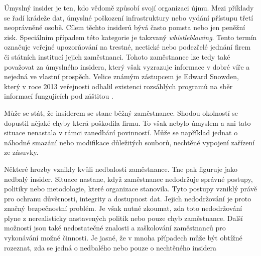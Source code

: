 Úmyslný insider je ten, kdo vědomě způsobí svojí organizaci újmu.
Mezi příklady se řadí krádeže dat, úmyslné poškození infrastruktury nebo vydání přístupu třetí neoprávněné osobě.
Cílem těchto insiderů bývá často pomsta nebo jen peněžní zisk.
Speciálním případem této kategorie je takzvaný \textit{whistleblowing}.
Tento termín označuje veřejné upozorňování na trestné, neetické nebo podezřelé jednání firem či státních institucí jejich zaměstnanci.
Tohoto zaměstnance lze tedy také považovat za úmyslného insidera, který však vyzrazuje informace v dobré víře a nejedná ve vlastní prospěch.
Velice známým zástupcem je Edward Snowden, který v roce 2013 veřejnosti odhalil existenci rozsáhlých programů na sběr informací fungujících pod záštitou \cite{Edward_Snowden}.

Může se stát, že insiderem se stane běžný zaměstnanec.
Shodou okolností se dopustil nějaké chyby která poškodila firmu.
To však nebylo úmyslem a ani tato situace nenastala v rámci zanedbání povinností.
Může se například jednat o náhodné smazání nebo modifikace důležitých souborů, nechtěné vypojení zařízení ze zásuvky.

Některé hrozby vznikly kvůli nedbalosti zaměstnance.
Tne pak figuruje jako nedbalý insider.
Situace nastane, když zaměstnanec nedodržuje správné postupy, politiky nebo metodologie, které organizace stanovila.
Tyto postupy vzniklý právě pro ochranu důvěrnosti, integrity a dostupnost dat.
Jejich nedodržování je proto značný bezpečnostní problém.
Je však nutné zkoumat, zda toto nedodržování plyne z nerealisticky nastavených politik nebo pouze chyb zaměstnance.
Další možností jsou také nedostatečné znalosti a zaškolování zaměstnanců pro vykonávání možné činnosti.
Je jasné, že v mnoha případech může být obtížné rozeznat, zda se jedná o nedbalého nebo pouze o nechtěného insidera


